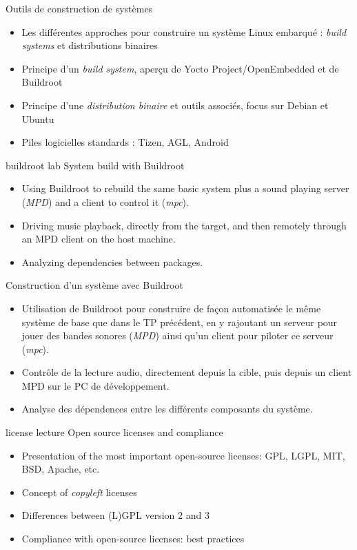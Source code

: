 {Outils de construction de systèmes}
{
  \begin{itemize}
  \item Les différentes approches pour construire un système Linux
    embarqué : {\em build systems} et distributions binaires
  \item Principe d'un {\em build system}, aperçu de Yocto
    Project/OpenEmbedded et de Buildroot
  \item Principe d'une {\em distribution binaire} et outils associés,
    focus sur Debian et Ubuntu
  \item Piles logicielles standards : Tizen, AGL, Android
  \end{itemize}
}
{buildroot}
{lab}
{System build with Buildroot}
{
  \begin{itemize}
  \item Using Buildroot to rebuild the same basic system
        plus a sound playing server ({\em MPD}) and a
        client to control it ({\em mpc}).
  \item Driving music playback, directly from the target,
        and then remotely through an MPD client on the
	host machine.
  \item Analyzing dependencies between packages.
  \end{itemize}
}
{Construction d'un système avec Buildroot}
{
  \begin{itemize}
  \item Utilisation de Buildroot pour construire de façon automatisée
    le même système de base que dans le TP précédent, en y rajoutant
    un serveur pour jouer des bandes sonores ({\em MPD}) ainsi
    qu'un client pour piloter ce serveur ({\em mpc}).
  \item Contrôle de la lecture audio, directement depuis la
    cible, puis depuis un client MPD sur le PC de développement.
  \item Analyse des dépendences entre les différents composants
    du système.
  \end{itemize}
}
{license}
{lecture}
{Open source licenses and compliance}
{
  \begin{itemize}
  \item Presentation of the most important open-source licenses: GPL,
    LGPL, MIT, BSD, Apache, etc.
  \item Concept of {\em copyleft} licenses
  \item Differences between (L)GPL version 2 and 3
  \item Compliance with open-source licenses: best practices
  \end{itemize}
}
